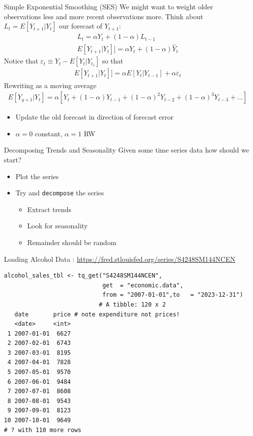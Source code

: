 \begin{frame}{Simple Exponential Smoothing (SES)}
We might want to weight older observations less and more recent observations more. Think about $L_t=E[Y_{t+1}|Y_t]$ our forecast of $Y_{t+1}$:
\begin{align*}
L_t = \alpha Y_t + (1-\alpha) L_{t-1}\\
E[Y_{t+1}|Y_t]] = \alpha Y_t + (1-\alpha) \hat{Y}_{t}
\end{align*}
Notice that $\varepsilon_t \equiv Y_t - E[Y_t| Y_{t_1}]$ so that
\begin{align*}
E[Y_{t+1}|Y_t]] = \alpha E[Y_t| Y_{t-1}] + \alpha \varepsilon_t
\end{align*}
Rewriting as a \alert{moving average}
\begin{align*}
E[Y_{y+1} | Y_t] = \alpha [ Y_t + (1-\alpha)Y_{t-1} + (1-\alpha)^2 Y_{t-2} + (1-\alpha)^3 Y_{t-3} + \ldots]
\end{align*}
\begin{itemize}
    \item Update the old forecast in direction of forecast error
    \item $\alpha=0$ constant, $\alpha=1$ RW
\end{itemize}
\end{frame}


\begin{frame}{Decomposing Trends and Seasonality}
Given some time series data how should we start?
\begin{itemize}
\item Plot the series
\item Try and \texttt{decompose} the series
\begin{itemize}
\item Extract \alert{trends}
\item Look for \alert{seasonality}
\item Remainder should be \alert{random}
\end{itemize}
\end{itemize}
\end{frame}

\begin{frame}[fragile]{Loading Alcohol Data : }
\small
\url{https://fred.stlouisfed.org/series/S4248SM144NCEN}
\begin{verbatim}
alcohol_sales_tbl <- tq_get("S4248SM144NCEN", 
                            get  = "economic.data", 
                            from = "2007-01-01",to   = "2023-12-31")
                           # A tibble: 120 x 2
   date       price # note expenditure not prices!
   <date>     <int>
 1 2007-01-01  6627
 2 2007-02-01  6743
 3 2007-03-01  8195
 4 2007-04-01  7828
 5 2007-05-01  9570
 6 2007-06-01  9484
 7 2007-07-01  8608
 8 2007-08-01  9543
 9 2007-09-01  8123
10 2007-10-01  9649
# ? with 110 more rows
\end{verbatim}
\end{frame}

